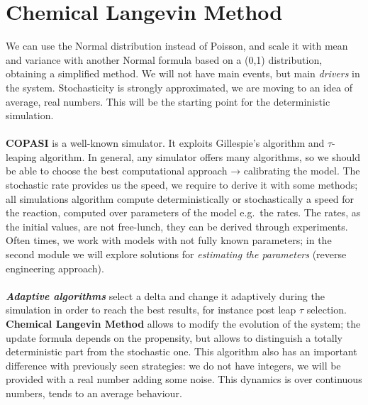 \section{Chemical Langevin Method}
We can use the Normal distribution instead of Poisson, and scale it with mean and variance with another Normal formula based on a (0,1) distribution, obtaining a simplified method.
We will not have main events, but main \emph{drivers} in the system.
Stochasticity is strongly approximated, we are moving to an idea of average, real numbers.
This will be the starting point for the deterministic simulation.
\\
\\
\noindent
\textbf{COPASI} is a well-known simulator.
It exploits Gillespie's algorithm and $\tau$-leaping algorithm.
In general, any simulator offers many algorithms, so we should be able to choose the best computational approach → calibrating the model.
The stochastic rate provides us the speed, we require to derive it with some methods; all simulations algorithm compute deterministically or stochastically a speed for the reaction, computed over parameters of the model e.g.~the rates.
The rates, as the initial values, are not free-lunch, they can be derived through experiments.
Often times, we work with models with not fully known parameters; in the second module we will explore solutions for \emph{estimating the parameters} (reverse engineering approach).
\\
\\
\noindent
\textbf{\emph{Adaptive algorithms}} select a delta and change it adaptively during the simulation in order to reach the best results, for instance post leap $\tau$ selection.
\textbf{Chemical Langevin Method} allows to modify the evolution of the system; the update formula depends on the propensity, but allows to distinguish a totally deterministic part from the stochastic one.
This algorithm also has an important difference with previously seen strategies: we do not have integers, we will be provided with a real number adding some noise.
This dynamics is over continuous numbers, tends to an average behaviour.

